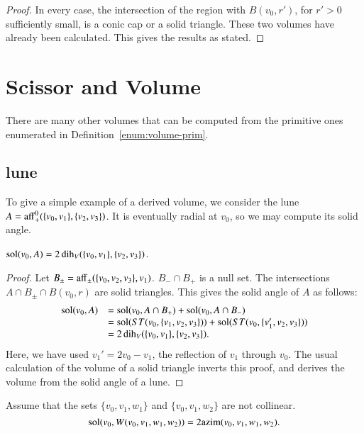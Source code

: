\begin{proof} In every case, the intersection of 
  the region with $B(v_0,r')$, for $r'>0$ sufficiently small, is
  a conic cap or a solid triangle.  These two volumes have
  already been calculated.  This gives the results as stated.
\end{proof}


\section{Scissor and Volume}

There are many other volumes that can be computed from the
primitive ones enumerated in Definition~\ref{enum:volume-prim}.

\subsection{lune}  

To give a simple example of a derived volume, we consider the
lune $A={\operatorname{aff}}_+^0(\{v_0,v_1\},\{v_2,v_3\})$.  It is eventually
radial at $v_0$, so we may compute its solid angle.

\begin{lemma}  $\operatorname{sol}(v_0,A) = 2\operatorname{dih}_V(\{v_0,v_1\},\{v_2,v_3\})$.
\end{lemma}

\begin{proof}
Let $B_{\pm} = {\operatorname{aff}}_\pm(\{v_0,v_2,v_3\},v_1)$.  $B_- \cap B_+$
is a null set.  The intersections $A\cap B_{\pm}\cap B(v_0,r)$ 
are solid triangles.  This gives the solid angle of $A$ as
follows:
   $$\begin{array}{lll}
   \operatorname{sol}(v_0,A) &= \operatorname{sol}(v_0,A\cap B_+)+\operatorname{sol}(v_0,A\cap B_-) \\
   &= 
   \operatorname{sol}(ST(v_0,\{v_1,v_2,v_3\})) + \operatorname{sol}(ST(v_0,\{v_1',v_2,v_3\})) \\
   &=
   2\operatorname{dih}_V(\{v_0,v_1\},\{v_2,v_3\}).
   \end{array}
   $$
Here, we have used $v_1'= 2 v_0 - v_1$, the reflection of $v_1$
through $v_0$.  The usual calculation of the volume of a solid triangle
inverts this proof, 
and derives the volume from the solid angle of a lune.
\end{proof}



\begin{lemma} 
Assume that the sets $\{v_0,v_1,w_1\}$ and
$\{v_0,v_1,w_2\}$ are not collinear. 
$$\operatorname{sol}(v_0,W(v_0,v_1,w_1,w_2)) = 2{\operatorname{azim}}(v_0,v_1,w_1,w_2).$$
\end{lemma}    

